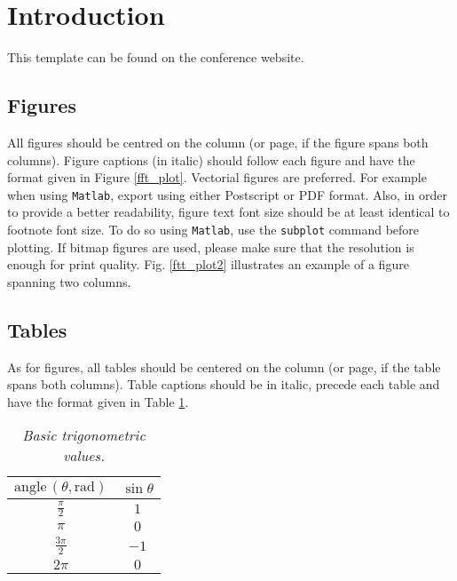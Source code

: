 \documentclass[twoside,a4paper]{article}
\title{\papertitle}
\newif\ifpdf
\begin{document}
\ifpdf %
  \DeclareGraphicsExtensions{.png,.jpg,.pdf}
\else  %
\fi

\maketitle

\begin{abstract}
TODO
\end{abstract}

\section{Introduction}
\label{sec:intro}
This template can be found on the conference website.

\subsection{Figures}
\label{ssec:figures}
All figures should be centred on the column (or page, if the figure spans both columns).
Figure captions (in italic) should follow each figure and have the format given in Figure \ref{fft_plot}.
%
Vectorial figures are preferred. For example when using
\texttt{Matlab}, export using either Postscript or PDF format. Also,
in order to provide a better readability, figure text font size
should be at least identical to footnote font size. To do so using
\texttt{Matlab}, use the \texttt{subplot} command before plotting.
If bitmap figures are used, please make sure that the resolution is
enough for print quality. Fig. \ref{ftt_plot2} illustrates an
example of a figure spanning two columns.
%
%

\subsection{Tables}
As for figures, all tables should be centered on the column (or page, if the table spans both columns).
Table captions should be in italic, precede each table and have the format given in Table \ref{tab:example}.

\begin{table}[ht]
  \caption{\itshape Basic trigonometric values.}
	\centering
	\begin{tabular}{|c|c|}
		\hline
		$\mathrm{angle}\,(\theta, \mathrm{rad})$ & $\sin \theta$ \\\hline
		$\frac{\pi}{2}$ & $1$ \\
		$\pi$ & $0$ \\
		$\frac{3\pi}{2}$ & $-1$ \\
		$2\pi$ & $0$ \\\hline
	\end{tabular}
	\label{tab:example}
\end{table}
\end{document}

